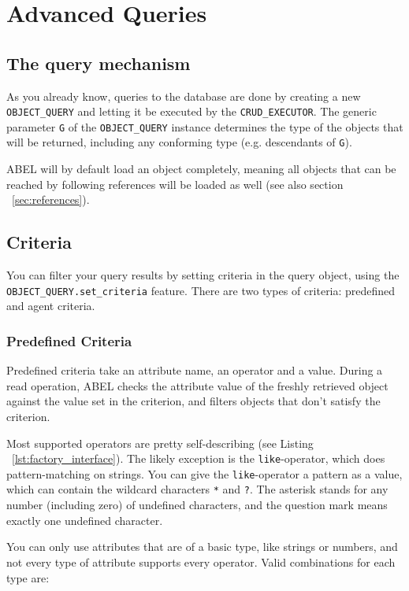 \section{Advanced Queries}
\label{sec:query}

\subsection{The query mechanism}

As you already know, queries to the database are done by creating a new \lstinline!OBJECT_QUERY! and letting it be executed by the \lstinline!CRUD_EXECUTOR!.
The generic parameter \lstinline!G! of the \lstinline!OBJECT_QUERY! instance determines the type of the objects that will be returned, including any conforming type (e.g. descendants of \lstinline!G!).

ABEL will by default load an object completely, meaning all objects that can be reached by following references will be loaded as well (see also section ~\ref{sec:references}).


\subsection{Criteria}

You can filter your query results by setting criteria in the query object, using the \lstinline!OBJECT_QUERY.set_criteria! feature.
There are two types of criteria: predefined and agent criteria.

\subsubsection{Predefined Criteria}
Predefined criteria take an attribute name, an operator and a value. 
During a read operation, ABEL checks the attribute value of the freshly retrieved object against the value set in the criterion, and filters objects that don't satisfy the criterion.

Most supported operators are pretty self-describing (see Listing ~\ref{lst:factory_interface}).
The likely exception is the \lstinline!like!-operator, which does pattern-matching on strings.
You can give the \lstinline!like!-operator a pattern as a value, which can contain the wildcard characters \lstinline!*! and \lstinline!?!.
The asterisk stands for any number (including zero) of undefined characters, and the question mark means exactly one undefined character.

You can only use attributes that are of a basic type, like strings or numbers, and not every type of attribute supports every operator. 
Valid combinations for each type are:

